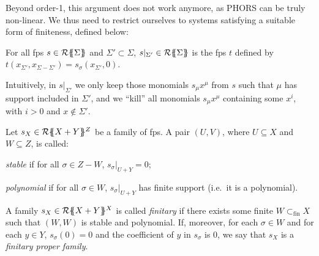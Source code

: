 Beyond order-1, this argument does not work anymore, as PHORS can be truly non-linear.
We thus need to restrict ourselves to systems satisfying a suitable form of finiteness, defined below:

\begin{definition}
For all fps $s\in {\mathcal{R}}\{\!\!\{\Sigma\}\!\!\}$ and $\Sigma'\subset \Sigma$,
 $s\vert_{\Sigma'}\in {\mathcal{R}}\{\!\!\{\Sigma\}\!\!\}$ is the fps $t$ defined by 
$t(x_{\Sigma'},x_{\Sigma-\Sigma'})=s_\sigma(x_{\Sigma'},0)$.
%
 

%
 \end{definition}
 Intuitively, in $s\vert_{\Sigma'}$ we only keep those monomials $s_\mu x^\mu$ from $s$ such that $\mu$ has support included in $\Sigma'$, and we 
 ``kill'' all monomials $s_\mu x^{\mu}$ containing 
 some $x^i$, with $i>0$ and $x\notin \Sigma'$. 
 
 
	\begin{definition}\label{def:finitary}
		Let $s_X\in {\mathcal{R}}\{\!\!\{X+Y\}\!\!\}^Z$ be a family of fps. A pair $(U,V)$, where $U\subseteq X$ and $W\subseteq Z$, is called:
	\begin{varitemize}
	\item \emph{stable} if for all $\sigma\in Z-W$, $s_\sigma \vert_{U+Y}=0$;
	\item \emph{polynomial} if for all $\sigma\in W$, $s_\sigma \vert_{U+Y}$ has finite support (i.e.~it is a polynomial).
	\end{varitemize}
A family $s_X\in {\mathcal{R}}\{\!\!\{X+Y\}\!\!\}^X$ is called \emph{finitary} if there exists some finite $W\subset_{\mathrm{fin}}X$ such that $(W,W)$ is stable and polynomial.	
If, moreover, for each $\sigma \in W$ and for each $y \in Y$, $s_\sigma(0)=0$ and the coefficient of $y$ in $s_\sigma$ is $0$, we say that $s_X$ is a \emph{finitary proper family}. 	
	\end{definition}

